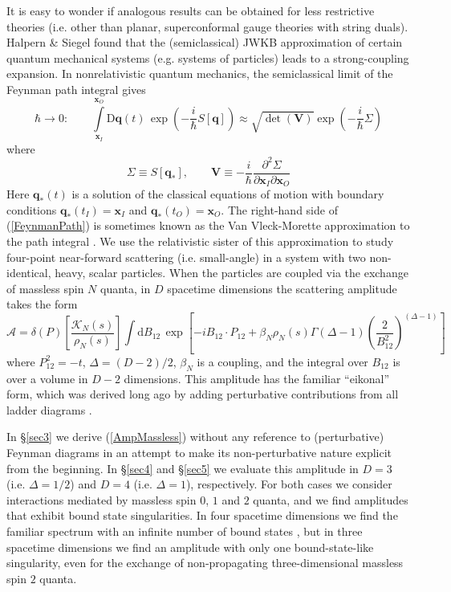 It is easy to wonder if analogous results can be obtained for less restrictive theories (i.e. other than planar, superconformal gauge theories with string duals). Halpern \& Siegel \cite{HalpernSiegel} found that the (semiclassical) JWKB approximation of certain quantum mechanical systems (e.g. systems of particles) leads to a strong-coupling expansion. In nonrelativistic quantum mechanics, the semiclassical limit of the Feynman path integral gives
\begin{equation}
	\hbar \rightarrow 0: \qquad \int\limits_{\mathbf{x}_{I}}^{\mathbf{x}_{O}} \mathrm{D}\mathbf{q}(t) \, \exp{\left( - \frac{i}{\hbar} S[\mathbf{q}] \right)} \approx \sqrt{\det{(\mathbf{V})}} \exp{\left( - \frac{i}{\hbar} \Sigma \right)} \label{FeynmanPath}
\end{equation}
where
\begin{equation}
	\Sigma \equiv S[\mathbf{q}_{*}], \qquad \mathbf{V} \equiv - \frac{i}{\hbar} \frac{\partial^{2} \Sigma}{\partial \mathbf{x}_{I} \partial \mathbf{x}_{O}}
\end{equation}
Here $\mathbf{q}_{*}(t)$ is a solution of the classical equations of motion with boundary conditions $\mathbf{q}_{*}(t_{I}) = \mathbf{x}_{I}$ and $\mathbf{q}_{*}(t_{O}) = \mathbf{x}_{O}$. The right-hand side of (\ref{FeynmanPath}) is sometimes known as the Van Vleck-Morette approximation to the path integral \cite{VanVleck,CartierMorette}. We use the relativistic sister of this approximation to study four-point near-forward scattering (i.e. small-angle) in a system with two non-identical, heavy, scalar particles. When the particles are coupled via the exchange of massless spin $N$ quanta, in $D$ spacetime dimensions the scattering amplitude takes the form
\begin{equation}
	\mathcal{A} = \delta(P) \left[ \frac{\mathcal{K}_{N}(s)}{\rho_{N}(s)} \right] \int \mathrm{d}B_{12} \, \exp{\left[ - i B_{12} \cdot P_{12} + \beta_{N} \rho_{N}(s) \Gamma(\Delta - 1) \left( \frac{2}{B_{12}^{2}} \right)^{(\Delta - 1)} \right]} \label{AmpMassless}
\end{equation}
where $P_{12}^{2} = -t$, $\Delta = (D - 2)/2$, $\beta_{N}$ is a coupling, and the integral over $B_{12}$ is over a volume in $D - 2$ dimensions. This amplitude has the familiar ``eikonal'' form, which was derived long ago by adding perturbative contributions from all ladder diagrams \cite{ChengWuPRL,AbarbItzyk,LevySucher1,ChangMa}.

In \S\ref{sec3} we derive (\ref{AmpMassless}) without any reference to (perturbative) Feynman diagrams in an attempt to make its non-perturbative nature explicit from the beginning. In \S\ref{sec4} and \S\ref{sec5} we evaluate this amplitude in $D = 3$ (i.e. $\Delta = 1/2$) and $D = 4$ (i.e. $\Delta = 1$), respectively. For both cases we consider interactions mediated by massless spin $0$, $1$ and $2$ quanta, and we find amplitudes that exhibit bound state singularities. In four spacetime dimensions we find the familiar spectrum with an infinite number of bound states \cite{BIZJ,KabatOrtiz,Dittrich}, but in three spacetime dimensions we find an amplitude with only one bound-state-like singularity, even for the exchange of non-propagating three-dimensional massless spin $2$ quanta.

